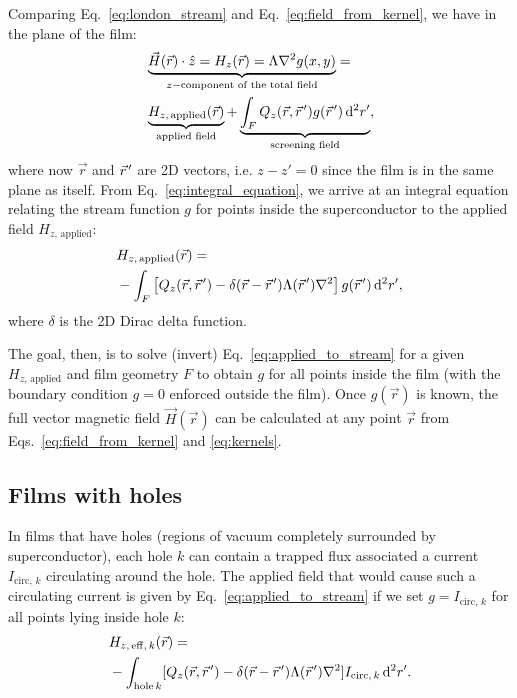 \documentclass[final,3p,times,twocolumn]{elsarticle}
\newcommand{\pvec}[1]{\vec{#1}\mkern2mu\vphantom{#1}}
\newcounter{bla}
\begin{document}
Comparing Eq.~\ref{eq:london_stream} and Eq.~\ref{eq:field_from_kernel}, we have in the plane of the film:
\begin{align}
    \label{eq:integral_equation}
    \begin{split}
        &\underbrace{\vec{H}(\vec{r})\cdot\hat{z} = H_z(\vec{r})
        = \Lambda\nabla^2g(x, y)}_{z-\text{component of the total field}}
        = \\ & \underbrace{H_{z,\,\mathrm{applied}}(\vec{r})}_{\text{applied field}}
        + \underbrace{\int_F Q_z(\vec{r},\pvec{r}')g(\pvec{r}')\,\mathrm{d}^2r'}_{\text{screening field}},
    \end{split}
\end{align}
where now $\vec{r}$ and $\pvec{r}'$ are 2D vectors, i.e. $z-z'=0$ since the film is in the same plane as itself. From Eq.~\ref{eq:integral_equation}, we arrive at an integral equation relating the stream function $g$ for points inside the superconductor to the applied field $H_{z,\,\mathrm{applied}}$:
\begin{align}
\begin{split}
    \label{eq:applied_to_stream}
    &H_{z,\,\mathrm{applied}}(\vec{r})
    = \\ &-\int_F\left[
        Q_z(\vec{r},\pvec{r}')-\delta(\vec{r}-\pvec{r}')\Lambda(\pvec{r}')\nabla^2\right
    ]g(\pvec{r}')\,\mathrm{d}^2r',
\end{split}
\end{align}
where $\delta$ is the 2D Dirac delta function.

The goal, then, is to solve (invert) Eq.~\ref{eq:applied_to_stream} for a given $H_{z,\,\mathrm{applied}}$ and film geometry $F$ to obtain $g$ for all points inside the film (with the boundary condition $g=0$ enforced outside the film). Once $g(\vec{r})$ is known, the full vector magnetic field $\vec{H}(\vec{r})$ can be calculated at any point $\vec{r}$
from Eqs.~\ref{eq:field_from_kernel} and \ref{eq:kernels}.

\subsection{Films with holes}
\label{section:model:holes}

In films that have holes (regions of vacuum completely surrounded by superconductor), each hole $k$ can contain a trapped flux associated a current $I_{\mathrm{circ},\,k}$ circulating around the hole. The applied field that would cause such a circulating current is given by Eq.~\ref{eq:applied_to_stream} if we set $g=I_{\mathrm{circ},\,k}$ for all points lying inside hole $k$:
\begin{align}
\begin{split}
    \label{eq:Heff}
    &H_{z,\,\mathrm{eff},\,k}(\vec{r}) = \\
    &-\int_{\mathrm{hole}\,k}[
        Q_z(\vec{r},\pvec{r}')-\delta(\vec{r}-\pvec{r}')\Lambda(\pvec{r}')\nabla^2
    ] I_{\mathrm{circ},\,k} \,\mathrm{d}^2r'.   
\end{split}
\end{align}
\end{document}
